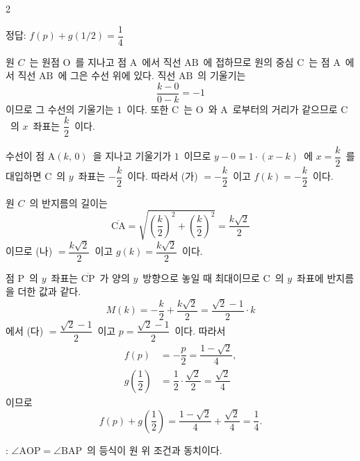 \documentclass[10pt,fleqn]{article}
\begin{document}
\dmsoltitlefirsttrue
\begin{multicols*}{2}

\begin{dmanswerbox}
정답: $f(p)+g(1/2)=\dfrac{1}{4}$
\end{dmanswerbox}

원 $C$\ 는 원점 $\mathrm{O}$\ 를 지나고 점 $\mathrm{A}$\ 에서 직선 $\mathrm{AB}$\ 에 접하므로 원의 중심 $\mathrm{C}$\ 는 점 $\mathrm{A}$\ 에서 직선 $\mathrm{AB}$\ 에 그은 수선 위에 있다. 직선 $\mathrm{AB}$\ 의 기울기는
\[ \dfrac{k - 0}{0 - k} = -1 \]
이므로 그 수선의 기울기는 $1$\ 이다. 또한 $\mathrm{C}$\ 는 $\mathrm{O}$\ 와 $\mathrm{A}$\ 로부터의 거리가 같으므로 $\mathrm{C}$\ 의 $x$\ 좌표는 $\dfrac{k}{2}$\ 이다.

수선이 점 $\mathrm{A}(k,\, 0)$\ 을 지나고 기울기가 $1$\ 이므로 $y - 0 = 1 \cdot (x - k)$\ 에 $x = \dfrac{k}{2}$\ 를 대입하면 $\mathrm{C}$\ 의 $y$\ 좌표는 $-\dfrac{k}{2}$\ 이다. 따라서 (가) $= -\dfrac{k}{2}$\ 이고 $f(k) = -\dfrac{k}{2}$\ 이다.

원 $C$\ 의 반지름의 길이는
\[ \overline{\mathrm{CA}} = \sqrt{\left( \dfrac{k}{2} \right)^2 + \left( \dfrac{k}{2} \right)^2} = \dfrac{k\sqrt{2}}{2} \]
이므로 (나) $= \dfrac{k\sqrt{2}}{2}$\ 이고 $g(k) = \dfrac{k\sqrt{2}}{2}$\ 이다.

점 $\mathrm{P}$\ 의 $y$\ 좌표는 $\overline{\mathrm{CP}}$\ 가 양의 $y$\ 방향으로 놓일 때 최대이므로 $\mathrm{C}$\ 의 $y$\ 좌표에 반지름을 더한 값과 같다.
\[ M(k) = -\dfrac{k}{2} + \dfrac{k\sqrt{2}}{2} = \dfrac{\sqrt{2} - 1}{2} \cdot k \]
에서 (다) $= \dfrac{\sqrt{2} - 1}{2}$\ 이고 $p = \dfrac{\sqrt{2} - 1}{2}$\ 이다. 따라서
\begin{align*}
  f(p) &= -\dfrac{p}{2} = \dfrac{1 - \sqrt{2}}{4},\\
  g\!\left( \dfrac{1}{2} \right) &= \dfrac{1}{2} \cdot \dfrac{\sqrt{2}}{2} = \dfrac{\sqrt{2}}{4}
\end{align*}
이므로
\[ f(p) + g\!\left( \dfrac{1}{2} \right) = \dfrac{1 - \sqrt{2}}{4} + \dfrac{\sqrt{2}}{4} = \dfrac{1}{4}. \]

\begin{dmcriticalpoint}
: $\angle \mathrm{AOP} = \angle \mathrm{BAP}$\ 의 등식이 원 위 조건과 동치이다.
\end{dmcriticalpoint}


\end{multicols*}
\end{document}
